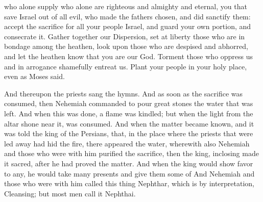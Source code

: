 {who alone supply
{} who alone are righteous and almighty and eternal, you that save Israel out of all evil, who made the fathers
{} chosen, and did sanctify them:
accept the sacrifice for all your people Israel, and guard your own portion, and consecrate it.
Gather together our Dispersion, set at liberty those who are in bondage among the heathen, look upon those who are despised and abhorred, and let the heathen know that you are our God.
Torment those who oppress us and in arrogance shamefully entreat us.
Plant your people in your holy place, even as Moses said.
\par }{\PP {}And thereupon the priests sang the hymns.
And as soon as the sacrifice was consumed, then Nehemiah commanded
 to pour
{} great stones the water that was left.
And when this was done, a flame was kindled;
 but when the light from the altar
 shone near it,
{} was consumed.
And when the matter became known, and it was told the king of the Persians, that, in the place where the priests that were led away had hid the fire, there appeared the water, wherewith also Nehemiah and those who were with him purified the sacrifice,
then the king, inclosing
{} made it sacred, after he had proved the matter.
And when the king would show favor to any, he would take
{} many presents and give them some of
{}
And Nehemiah and those who were with him called this thing Nephthar, which is by interpretation, Cleansing; but most men call it Nephthai.

}
